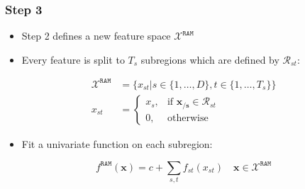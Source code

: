 \documentclass{beamer}
\begin{document}
\begin{frame}
  \frametitle{Step 3}
  \begin{itemize}
  \item Step 2 defines a new feature space \(\mathcal{X}^{\mathtt{RAM}}\)
  \item Every feature is split to $T_s$ subregions which are defined by $\mathcal{R}_{st}$:
  \end{itemize}

\begin{equation}
\label{eq:ram_feature_space}
\begin{aligned}
\mathcal{X}^{\mathtt{RAM}} &= \{x_{st} | s \in \{1, \ldots, D\}, t \in \{1, \ldots, T_s\}\} \\
x_{st} &= \begin{cases}
x_s, & \text{if } \mathbf{x_{/s}} \in \mathcal{R}_{st} \\
0, & \text{otherwise}
\end{cases}
\end{aligned}
\end{equation}

\begin{itemize}
\item Fit a univariate function on each subregion:
\end{itemize}

\begin{equation}
\label{eq:ram_formulation2}
f^{\mathtt{RAM}}(\mathbf{x})= c + \sum_{s,t} f_{st}(x_{st}) \quad \mathbf{x} \in \mathcal{X}^{\mathtt{RAM}}
\end{equation}

\end{frame}
\end{document}

